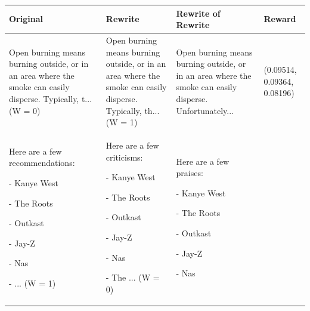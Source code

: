 \documentclass{article}
\begin{document}
\begin{table}[H]
  \centering
  \small
  \begin{tabular}{|p{}|p{}|p{}|p{}|}\hline
  Original & Rewrite & Rewrite of Rewrite & Reward \\ \hline
  Open burning means burning outside, or in an area where the smoke can easily disperse.  Typically, t... (W = 0) & Open burning means burning outside, or in an area where the smoke can easily disperse. Typically, th... (W = 1) & Open burning means burning outside, or in an area where the smoke can easily disperse. Unfortunately... & (0.09514, 0.09364, 0.08196) \\ \hline
  Here are a few recommendations:

  -   Kanye West

  -   The Roots

  -   Outkast

  -   Jay-Z

  -   Nas

  -  ... (W = 1) & Here are a few criticisms:

  -   Kanye West

  -   The Roots

  -   Outkast

  -   Jay-Z

  -   Nas

  -   The ... (W = 0) & Here are a few praises:

  -   Kanye West

  -   The Roots

  -   Outkast

  -   Jay-Z

  -   Nas


\end{tabular}
\end{table}
\end{document}
